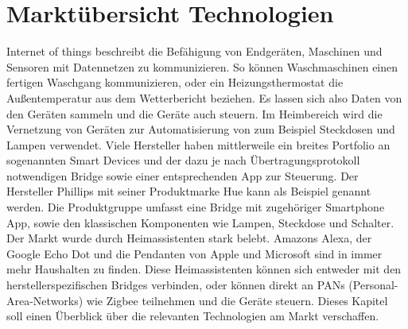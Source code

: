 \chapter{Marktübersicht Technologien}

\grqq Internet of things\grqq{} beschreibt die Befähigung von Endgeräten, Maschinen und Sensoren mit Datennetzen zu kommunizieren. So können Waschmaschinen einen fertigen Waschgang kommunizieren,
oder ein Heizungsthermostat die Außentemperatur aus dem Wetterbericht beziehen. Es lassen sich also Daten von den Geräten sammeln und die Geräte auch steuern. Im Heimbereich 
wird die Vernetzung von Geräten zur Automatisierung von zum Beispiel Steckdosen und Lampen verwendet.
Viele Hersteller haben mittlerweile ein breites Portfolio an sogenannten \grqq Smart Devices\grqq{} und der dazu
je nach Übertragungsprotokoll notwendigen \grqq Bridge\grqq{} sowie einer entsprechenden App zur Steuerung. Der Hersteller Phillips mit seiner Produktmarke \grqq Hue\grqq{}
kann als Beispiel genannt werden. Die Produktgruppe umfasst eine Bridge mit zugehöriger Smartphone App, sowie den klassischen Komponenten wie Lampen, Steckdose und Schalter.
Der Markt wurde durch Heimassistenten stark belebt. Amazons Alexa, der Google Echo Dot und die Pendanten von Apple und Microsoft sind in immer mehr Haushalten zu finden.
Diese Heimassistenten können sich entweder mit den herstellerspezifischen Bridges verbinden, oder können direkt an PANs (Personal-Area-Networks) wie Zigbee
teilnehmen und die Geräte steuern. Dieses Kapitel soll einen Überblick über die relevanten Technologien am Markt verschaffen. 


